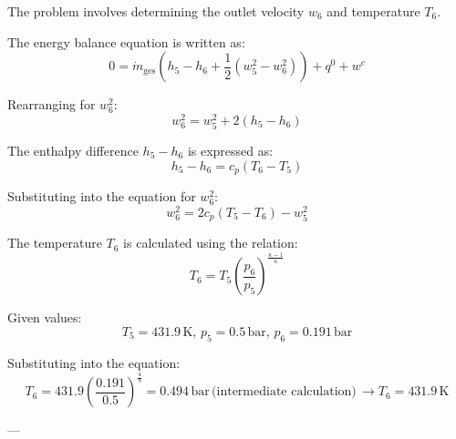 The problem involves determining the outlet velocity \( w_6 \) and temperature \( T_6 \).  

The energy balance equation is written as:  
\[
0 = \dot{m}_{\text{ges}} (h_5 - h_6 + \frac{1}{2}(w_5^2 - w_6^2)) + q^0 + w^c
\]  

Rearranging for \( w_6^2 \):  
\[
w_6^2 = w_5^2 + 2(h_5 - h_6)
\]  

The enthalpy difference \( h_5 - h_6 \) is expressed as:  
\[
h_5 - h_6 = c_p (T_6 - T_5)
\]  

Substituting into the equation for \( w_6^2 \):  
\[
w_6^2 = 2 c_p (T_5 - T_6) - w_5^2
\]  

The temperature \( T_6 \) is calculated using the relation:  
\[
T_6 = T_5 \left( \frac{p_6}{p_5} \right)^{\frac{\kappa - 1}{\kappa}}
\]  

Given values:  
\[
T_5 = 431.9 \, \text{K}, \, p_5 = 0.5 \, \text{bar}, \, p_6 = 0.191 \, \text{bar}
\]  

Substituting into the equation:  
\[
T_6 = 431.9 \left( \frac{0.191}{0.5} \right)^{\frac{4}{9}} = 0.494 \, \text{bar} \, \text{(intermediate calculation)} \, \rightarrow T_6 = 431.9 \, \text{K}
\]  

---